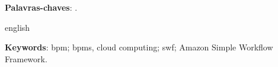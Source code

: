 \documentclass[12pt,openright,twoside,a4paper,english]{abntex2}
\begin{document}
\frenchspacing

\pretextual

\imprimircapa

\imprimirfolhaderosto


\begin{resumo}[Resumo]

 \vspace{\onelineskip}
 \noindent
 \textbf{Palavras-chaves}: .
\end{resumo}

\begin{resumo}[Abstract]
 \begin{otherlanguage*}{english}

   \vspace{\onelineskip}
   \noindent
   \textbf{Keywords}: bpm; bpms, cloud computing; swf; Amazon Simple Workflow Framework.
 \end{otherlanguage*}
\end{resumo}




\end{document}
